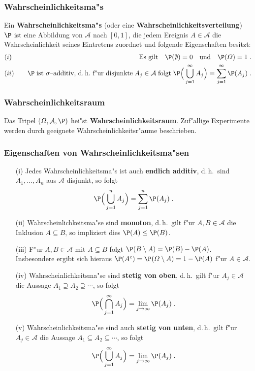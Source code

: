 \documentclass[ngerman,draft,parskip=half,twoside]{scrartcl}
\newtheorem{thm}{Satz}[section]
\newcommand*{\Algeb}{\mathcal{A}}   %
\begin{document}
\subsubsection{Wahrscheinlichkeitsma"s}
Ein \textbf{Wahrscheinlichkeitsma"s} (oder eine \textbf{Wahrscheinlichkeitsverteilung})
 $\P$ ist eine Abbildung von
$\Algeb$ nach $[0,1]$, die jedem Ereignis $A\in \Algeb$ die Wahrscheinlichkeit seines
Eintretens zuordnet und folgende Eigenschaften besitzt$\colon$
\begin{eqnarray*}
&(i)&\quad\mbox{Es gilt}\quad \P(\emptyset)=0\quad\mbox{und}\quad \P(\Omega)=1\;.\\
&(ii)&\quad
\P\;\mbox{ist $\sigma$--additiv, d.\,h.~f"ur disjunkte}\;A_j\in\Algeb\;\mbox{folgt}\;
\P\Big(\bigcup_{j=1}^\infty A_j\Big)=\sum_{j=1}^\infty\P(A_j)\;.
\end{eqnarray*}
\subsubsection{Wahrscheinlichkeitsraum}
Das Tripel $(\Omega,\Algeb,\P)$ hei"st \textbf{Wahrscheinlichkeitsraum}. Zuf"allige
Experimente werden durch geeignete Wahrscheinlichkeitsr"aume  beschrieben.
\subsubsection{Eigenschaften von Wahrscheinlichkeitsma"sen}
\begin{enumerate}
\item[\rm(i)]
Jedes Wahrscheinlichkeitsma"s ist auch \textbf{endlich additiv}, d.\,h.~sind
$A_1,\ldots,A_n$ aus $\Algeb$ disjunkt, so folgt
$$
\P\Big(\bigcup_{j=1}^n A_j\Big)=\sum_{j=1}^n\P(A_j)\;.
$$
\item[\rm(ii)]
Wahrscheinlichkeitsma"se sind \textbf{monoton}, d.\,h.~gilt f"ur $A,B\in\Algeb$ die Inklusion
$A\subseteq B$, so impliziert dies $\P(A)\le\P(B)$.
\item[\rm(iii)]
F"ur $A,B\in\Algeb$ mit $A\subseteq B$ folgt $\P(B\setminus A)=\P(B)-\P(A)$. Insbesondere ergibt sich hieraus
$\P(A^c)=\P(\Omega\setminus A)=1-\P(A)$ f"ur $A\in\Algeb$.
\item[\rm(iv)]
Wahrscheinlichkeitsma"se sind \textbf{stetig von oben}, d.\,h.~gilt f"ur $A_j\in\Algeb$
die Aussage $A_1\supseteq A_2\supseteq\cdots$,
so folgt
$$
\P\Big(\bigcap_{j=1}^\infty A_j\Big)=\lim_{j\to\infty}\P(A_j)\;.
$$
\item[\rm(v)]
Wahrscheinlichkeitsma"se sind auch \textbf{stetig von unten}, d.\,h.~gilt f"ur $A_j\in\Algeb$
die Aussage $A_1\subseteq A_2\subseteq\cdots$,
so folgt
$$
\P\Big(\bigcup_{j=1}^\infty A_j\Big)=\lim_{j\to\infty}\P(A_j)\;.
$$
\end{enumerate}
\end{document}
